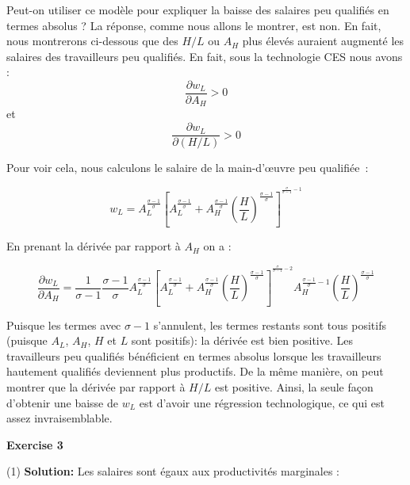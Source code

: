 \documentclass[11pt,a4paper]{article}
\begin{document}
    
Peut-on utiliser ce modèle pour expliquer la baisse des salaires peu qualifiés en termes absolus ? La réponse, comme nous allons le montrer, est non. En fait, nous montrerons ci-dessous que des $H/L$ ou $A_H$ plus élevés auraient augmenté les salaires des travailleurs peu qualifiés. En fait, sous la technologie CES nous avons : \begin{equation}
        \frac{\partial w_L}{\partial A_H} >0 
    \end{equation}
  et  \begin{equation}
        \frac{\partial w_L}{\partial (H/L)} >0 
    \end{equation}
    
Pour voir cela, nous calculons le salaire de la main-d'œuvre peu qualifiée :
    
    \begin{equation}
        w_L=A_L^{\frac{\sigma-1}{\sigma}} \left[A_L^{\frac{\sigma-1}{\sigma}} +A_H^{\frac{\sigma-1}{\sigma}}(\frac{H}{L})^{\frac{\sigma-1}{\sigma}}\right]^{^{\frac{\sigma}{\sigma-1}-1}}
    \end{equation}
    
En prenant la dérivée par rapport à $A_H$ on a :
    
    \begin{equation}
             \frac{\partial w_L}{\partial A_H}= \frac{1}{\sigma-1} \frac{\sigma-1}{\sigma} A_L^{\frac{\sigma-1}{\sigma}} \left[A_L^{\frac{\sigma-1}{\sigma}} +A_H^{\frac{\sigma-1}{\sigma}}(\frac{H}{L})^{\frac{\sigma-1}{\sigma}}\right]^{^{\frac{\sigma}{\sigma-1}-2}}A_H^{\frac{\sigma-1}{\sigma}-1}(\frac{H}{L})^{\frac{\sigma-1}{\sigma}}
             \end{equation}

Puisque les termes avec $\sigma-1$ s'annulent, les termes restants sont tous positifs (puisque $A_L$, $A_H$, $H$ et $L$ sont positifs):  la dérivée est bien positive. Les travailleurs peu qualifiés bénéficient en termes absolus lorsque les travailleurs hautement qualifiés deviennent plus productifs. De la même manière, on peut montrer que la dérivée par rapport à $H/L$ est positive. Ainsi, la seule façon d'obtenir une baisse de $w_L$ est d'avoir une régression technologique, ce qui est assez invraisemblable.


\begin{center}
\textbf{Exercise 3} 
\end{center}


(1) \textbf{Solution:} Les salaires sont égaux aux productivités marginales :
\end{document}
